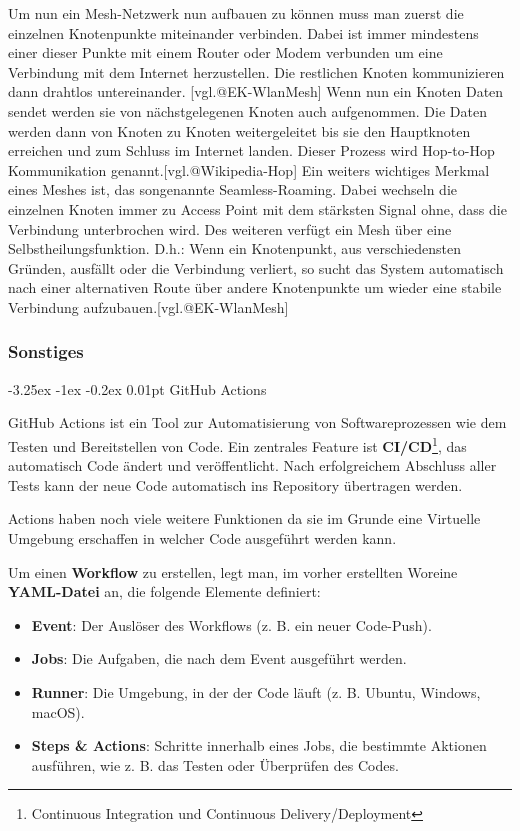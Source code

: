 \documentclass[
    headings=optiontotocandhead,%
    twoside,
    numbers=noenddot,%
    12pt, %
    titlepage, %
    parskip=full, %
    listof=leveldown, 
    numbers=noenddot, %
    a4paper,DIV=14,
    BCOR=15mm,
]{scrbook}
\makeatletter
\providecommand{\tightlist}{%
  \setlength{\itemsep}{0pt}\setlength{\parskip}{0pt}}
\renewcommand\paragraph{\@startsection{paragraph}{4}{\z@}%
    {-3.25ex \@plus -1ex \@minus -0.2ex}%
    {0.01pt}%
    {\raggedsection\normalfont\sectfont\nobreak\size@paragraph}%
  }
\makeatother
\begin{document}
Um nun ein Mesh-Netzwerk nun aufbauen zu können muss man zuerst die
einzelnen Knotenpunkte miteinander verbinden. Dabei ist immer mindestens
einer dieser Punkte mit einem Router oder Modem verbunden um eine
Verbindung mit dem Internet herzustellen. Die restlichen Knoten
kommunizieren dann drahtlos untereinander. {[}vgl.@EK-WlanMesh{]} Wenn
nun ein Knoten Daten sendet werden sie von nächstgelegenen Knoten auch
aufgenommen. Die Daten werden dann von Knoten zu Knoten weitergeleitet
bis sie den Hauptknoten erreichen und zum Schluss im Internet landen.
Dieser Prozess wird Hop-to-Hop Kommunikation
genannt.{[}vgl.@Wikipedia-Hop{]} Ein weiters wichtiges Merkmal eines
Meshes ist, das songenannte Seamless-Roaming. Dabei wechseln die
einzelnen Knoten immer zu Access Point mit dem stärksten Signal ohne,
dass die Verbindung unterbrochen wird. Des weiteren verfügt ein Mesh
über eine Selbstheilungsfunktion. D.h.: Wenn ein Knotenpunkt, aus
verschiedensten Gründen, ausfällt oder die Verbindung verliert, so sucht
das System automatisch nach einer alternativen Route über andere
Knotenpunkte um wieder eine stabile Verbindung
aufzubauen.{[}vgl.@EK-WlanMesh{]}

\hypertarget{sonstiges}{%
\subsubsection{Sonstiges}\label{sonstiges}}

\hypertarget{github-actions}{%
\paragraph{GitHub Actions}\label{github-actions}}

GitHub Actions ist ein Tool zur Automatisierung von Softwareprozessen
wie dem Testen und Bereitstellen von Code. Ein zentrales Feature ist
\textbf{CI/CD}\footnote{Continuous Integration und Continuous
  Delivery/Deployment}, das automatisch Code ändert und veröffentlicht.
Nach erfolgreichem Abschluss aller Tests kann der neue Code automatisch
ins Repository übertragen werden.

Actions haben noch viele weitere Funktionen da sie im Grunde eine
Virtuelle Umgebung erschaffen in welcher Code ausgeführt werden kann.

Um einen \textbf{Workflow} zu erstellen, legt man, im vorher erstellten
Woreine \textbf{YAML-Datei} an, die folgende Elemente definiert:

\begin{itemize}
\tightlist
\item
  \textbf{Event}: Der Auslöser des Workflows (z. B. ein neuer
  Code-Push).\\
\item
  \textbf{Jobs}: Die Aufgaben, die nach dem Event ausgeführt werden.\\
\item
  \textbf{Runner}: Die Umgebung, in der der Code läuft (z. B. Ubuntu,
  Windows, macOS).\\
\item
  \textbf{Steps \& Actions}: Schritte innerhalb eines Jobs, die
  bestimmte Aktionen ausführen, wie z. B. das Testen oder Überprüfen des
  Codes.
\end{itemize}
\end{document}
